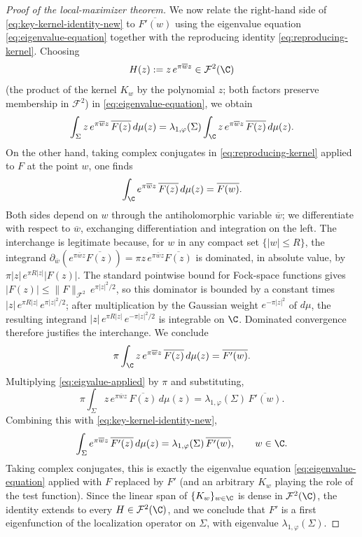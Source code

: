 \begin{proof}[Proof of the local-maximizer theorem]
We now relate the right-hand side of \eqref{eq:key-kernel-identity-new} to
\(\overline{F'(w)}\) using the eigenvalue equation
\eqref{eq:eigenvalue-equation} together with the reproducing identity
\eqref{eq:reproducing-kernel}. Choosing
\[
H(z):=z\,e^{\pi\overline w z}\in \mathcal F^2(\C)
\]
(the product of the kernel \(K_w\) by the polynomial \(z\); both factors
preserve membership in \(\mathcal F^2\)) in \eqref{eq:eigenvalue-equation}, we
obtain
\begin{equation}\label{eq:eigvalue-applied}
\int_\Sigma z\, e^{\pi \overline wz}\,\overline{F(z)}\,d\mu(z)
=
\lambda_{1,\varphi}(\Sigma)\int_\C z\, e^{\pi \overline wz}\,\overline{F(z)}\,d\mu(z).
\end{equation}
On the other hand, taking complex conjugates in \eqref{eq:reproducing-kernel}
applied to \(F\) at the point \(w\), one finds
\[
\int_\C e^{\pi \overline wz}\,\overline{F(z)}\,d\mu(z)=\overline{F(w)}.
\]
Both sides depend on \(w\) through the antiholomorphic variable
\(\overline w\); we differentiate with respect to \(\overline w\), exchanging
differentiation and integration on the left. The interchange is legitimate
because, for \(w\) in any compact set \(\{|w|\le R\}\), the integrand
\(\partial_{\overline w}(e^{\pi\overline wz}\overline{F(z)})
=\pi z\,e^{\pi\overline wz}\overline{F(z)}\) is dominated, in absolute
value, by \(\pi |z|\,e^{\pi R|z|}|F(z)|\). The standard pointwise bound for
Fock-space functions gives \(|F(z)|\le\|F\|_{\mathcal F^2}\,e^{\pi |z|^2/2}\),
so this dominator is bounded by a constant times
\(|z|\,e^{\pi R|z|}\,e^{\pi|z|^2/2}\); after multiplication by the Gaussian
weight \(e^{-\pi|z|^2}\) of \(d\mu\), the resulting integrand
\(|z|\,e^{\pi R|z|}\,e^{-\pi |z|^2/2}\) is integrable on \(\C\). Dominated
convergence therefore justifies the interchange. We conclude
\[
\pi\int_\C z\, e^{\pi \overline wz}\,\overline{F(z)}\,d\mu(z)
=
\overline{F'(w)}.
\]
Multiplying \eqref{eq:eigvalue-applied} by \(\pi\) and substituting,
\[
\pi\int_\Sigma z\, e^{\pi \overline wz}\,\overline{F(z)}\,d\mu(z)
=
\lambda_{1,\varphi}(\Sigma)\,\overline{F'(w)}.
\]
Combining this with \eqref{eq:key-kernel-identity-new},
\[
\int_\Sigma e^{\pi \overline wz}\,\overline{F'(z)}\,d\mu(z)
=
\lambda_{1,\varphi}(\Sigma)\,\overline{F'(w)},
\qquad w\in \C.
\]
Taking complex conjugates, this is exactly the eigenvalue equation
\eqref{eq:eigenvalue-equation} applied with \(F\) replaced by \(F'\) (and an
arbitrary \(K_w\) playing the role of the test function). Since the linear
span of \(\{K_w\}_{w\in\C}\) is dense in \(\mathcal F^2(\C)\), the identity
extends to every \(H\in\mathcal F^2(\C)\), and we conclude that \(F'\) is a
first eigenfunction of the localization operator on \(\Sigma\), with eigenvalue
\(\lambda_{1,\varphi}(\Sigma)\).


\end{proof}

